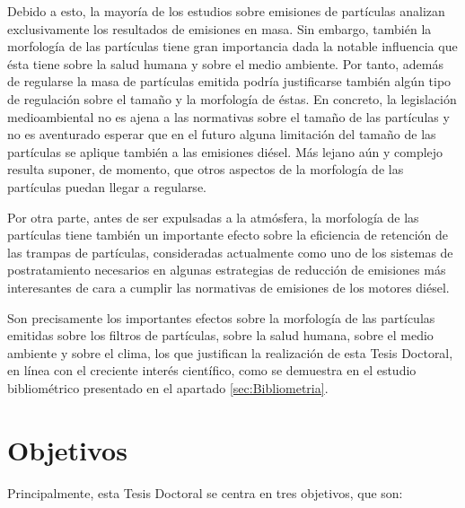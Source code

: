 \par Debido a esto, la mayoría de los estudios sobre emisiones de  partículas analizan exclusivamente los resultados de emisiones en masa. Sin embargo, también la  morfología de las partículas tiene gran importancia dada la notable influencia que ésta tiene sobre la salud humana y sobre el medio ambiente. Por tanto, además de regularse la masa de partículas emitida podría justificarse también algún tipo de regulación sobre el tamaño y la morfología de éstas. En concreto, la legislación medioambiental no es ajena a las normativas sobre el tamaño de las partículas y no es aventurado esperar que en el futuro alguna limitación del tamaño de las partículas se aplique también a las emisiones diésel. Más lejano aún y complejo resulta suponer, de momento, que otros aspectos de la morfología de las partículas puedan llegar a regularse.

\par Por otra parte, antes de ser expulsadas a la atmósfera, la morfología de las partículas tiene también un importante efecto sobre la eficiencia de retención de las  trampas de partículas, consideradas actualmente como uno de los sistemas de postratamiento necesarios en algunas estrategias de reducción de emisiones más interesantes de cara a cumplir las normativas de emisiones de los motores diésel.

\par Son precisamente los importantes efectos sobre la morfología de las partículas emitidas sobre los filtros de partículas, sobre la salud humana, sobre el medio ambiente y sobre el clima, los que justifican la realización de esta Tesis Doctoral, en línea con el creciente interés científico, como se demuestra en el estudio bibliométrico presentado en el apartado \ref{sec:Bibliometria}.

\section{Objetivos}\label{sec:Objetivos}

\par Principalmente, esta Tesis Doctoral se centra en tres objetivos, que son:

